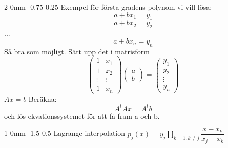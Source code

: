 \documentclass[a4paper,11pt]{article}
\makeatletter
\renewcommand{\section}{\@startsection
   {section}%
   {1}%
   {0mm}%
   {-1.5\baselineskip}%
   {0.5\baselineskip}%
   {\sffamily\bfseries\upshape\normalsize}}%
\renewcommand{\subsection}{\@startsection
   {subsection}%
   {2}%
   {0mm}%
   {-0.75\baselineskip}%
   {0.25\baselineskip}%
   {\rmfamily\normalfont\slshape\normalsize}}%
\makeatother
\begin{document}
\subsection{Exempel för första gradens polynom}
vi vill lösa:
$$a+bx_1=y_1$$
$$a+bx_2=y_2$$
\centering
...
$$a+bx_n=y_n$$
Så bra som möjligt. Sätt upp det i matrisform
\[ \left( \begin{array}{ccc}
1 & x_1  \\
1 & x_2  \\
\vdots & \vdots  \\
1 & x_n  \end{array} \right)
 \left( \begin{array}{ccc}
a   \\
b     \end{array} \right)=
\left( \begin{array}{ccc}
 y_1  \\
 y_2  \\
 \vdots  \\
 y_n  \end{array} \right)
\]
$Ax=b$
Beräkna:
$$A^tAx=A^tb$$
och lös ekvationssystemet för att få fram a och b.

\section{Lagrange interpolation}
$p_j(x)=y_j\prod_{k=1, k\neq j}\dfrac{x-x_k}{x_j-x_k}$
\end{document}
